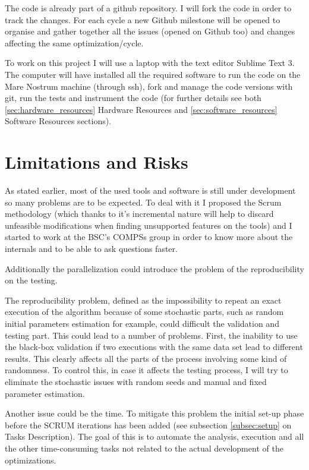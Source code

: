 The code is already part of a github repository. I will fork the code in order to track the changes. For each cycle a new Github milestone will be opened to organise and gather together all the issues (opened on Github too) and changes affecting the same optimization/cycle. 

To work on this project I will use a laptop with the text editor Sublime Text 3. The computer will have installed all the required software to run the code on the Mare Nostrum machine (through ssh), fork and manage the code versions with git, run the tests and instrument the code (for further details see both \ref{sec:hardware_resources} Hardware Resources and \ref{sec:software_resources} Software Resources sections).

\section{Limitations and Risks}

As stated earlier, most of the used tools and software is still under development so many problems are to be expected. To deal with it I proposed the Scrum methodology (which thanks to it's incremental nature will help to discard unfeasible modifications when finding unsupported features on the tools) and I started to work at the BSC's COMPSs group in order to know more about the internals and to be able to ask questions faster.

Additionally the parallelization could introduce the problem of the reproducibility on the testing. 

The reproducibility problem, defined as the impossibility to repeat an exact execution of the algorithm because of some stochastic parts, such as random initial parameters estimation for example, could difficult the validation and testing part. This could lead to a number of problems. First, the inability to use the black-box validation if two executions with the same data set lead to different results. This clearly affects all the parts of the process involving some kind of randomness. To control this, in case it  affects the testing process, I will try to eliminate the stochastic issues with random seeds and manual and fixed parameter estimation.

Another issue could be the time. To mitigate this problem the initial set-up phase before the SCRUM iterations has been added (see subsection \ref{subsec:setup} on Tasks Description). The goal of this is to automate the analysis, execution and all the other time-consuming tasks not related to the actual development of the optimizations. 

